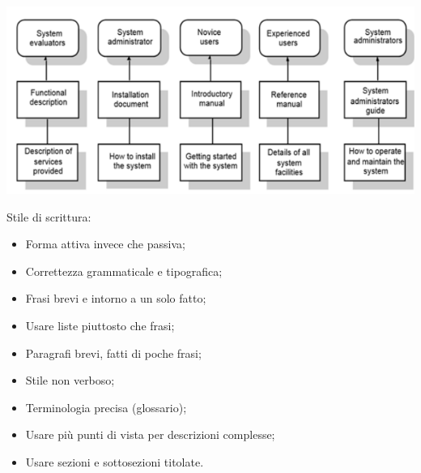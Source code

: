 \includegraphics[width=0.5\columnwidth]{img2} %


Stile di scrittura:

\begin{itemize}

	\item Forma attiva invece che passiva;
	\item Correttezza grammaticale e tipografica;
	\item Frasi brevi e intorno a un solo fatto;
	\item Usare liste piuttosto che frasi;
	\item Paragrafi brevi, fatti di poche frasi;
	\item Stile non verboso;
	\item Terminologia precisa (glossario);
	\item Usare più punti di vista per descrizioni complesse;
	\item Usare sezioni e sottosezioni titolate.

\end{itemize}


